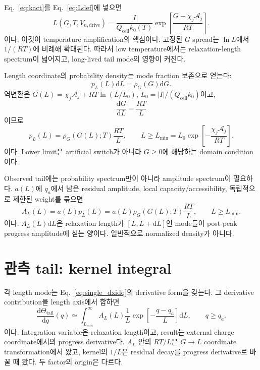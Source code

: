 \documentclass[11pt,a4paper]{article}
\newcommand{\dd}{\mathrm{d}}
\newcommand{\drive}{\mathrm{drive}}
\newcommand{\cell}{\mathrm{cell}}
\newcommand{\tail}{\mathrm{tail}}
\begin{document}
Eq.~\eqref{eq:kact}를 Eq.~\eqref{eq:Ldef}에 넣으면
\begin{equation}
\boxed{\;L(G,T,V_{n,\drive})=\frac{|I|}{Q_{\cell}k_0(T)}
\exp\left[\frac{G-\chi_j\mathcal A_j}{RT}\right].\;}
\label{eq:L_of_G}
\end{equation}
이다. 이것이 temperature amplification의 핵심이다. 고정된 $G$ spread는 $\ln L$에서 $1/(RT)$에 비례해 확대된다.
따라서 low temperature에서는 relaxation-length spectrum이 넓어지고, long-lived tail mode의 영향이 커진다.

Length coordinate의 probability density는 mode fraction 보존으로 얻는다:
\begin{equation}
p_L(L)\dd L=\rho_G(G)\dd G.
\end{equation}
역변환은 $G(L)=\chi_j\mathcal A_j+RT\ln(L/L_0)$, $L_0=|I|/(Q_{\cell}k_0)$이고,
\begin{equation}
\frac{\dd G}{\dd L}=\frac{RT}{L}
\end{equation}
이므로
\begin{equation}
\boxed{\;p_L(L)=\rho_G(G(L);T)\frac{RT}{L},\qquad
L\ge L_{\min}=L_0\exp\left[-\frac{\chi_j\mathcal A_j}{RT}\right].\;}
\label{eq:spectrum_prob}
\end{equation}
이다. Lower limit은 artificial switch가 아니라 $G\ge0$에 해당하는 domain condition이다.

Observed tail에는 probability spectrum만이 아니라 amplitude spectrum이 필요하다. $a(L)$에 $q_a$에서 남은 residual amplitude,
local capacity/accessibility, 독립적으로 제한된 weight를 묶으면
\begin{equation}
\boxed{\;A_L(L)=a(L)p_L(L)=a(L)\rho_G(G(L);T)\frac{RT}{L},\qquad L\ge L_{\min}.\;}
\label{eq:spectrum}
\end{equation}
이다. $A_L(L)\dd L$은 relaxation length가 $[L,L+\dd L]$인 mode들이 post-peak progress amplitude에 싣는 양이다.
일반적으로 normalized density가 아니다.

\section{관측 tail: kernel integral}\label{sec:kernel}
각 length mode는 Eq.~\eqref{eq:single_dxidq}의 derivative form을 갖는다. 그 derivative contribution을 length axis에서 합하면
\begin{equation}
\boxed{\;\frac{\dd\Theta_{\tail}}{\dd q}(q)
\simeq \int_{L_{\min}}^\infty A_L(L)\frac{1}{L}
\exp\left[-\frac{q-q_a}{L}\right]\dd L,
\qquad q\ge q_a.\;}
\label{eq:kernel_integral}
\end{equation}
이다. Integration variable은 relaxation length이고, result는 external charge coordinate에서의 progress derivative다.
$A_L$ 안의 $RT/L$은 $G\to L$ coordinate transformation에서 왔고, kernel의 $1/L$은 residual decay를 progress derivative로
바꿀 때 왔다. 두 factor의 origin은 다르다.
\end{document}
